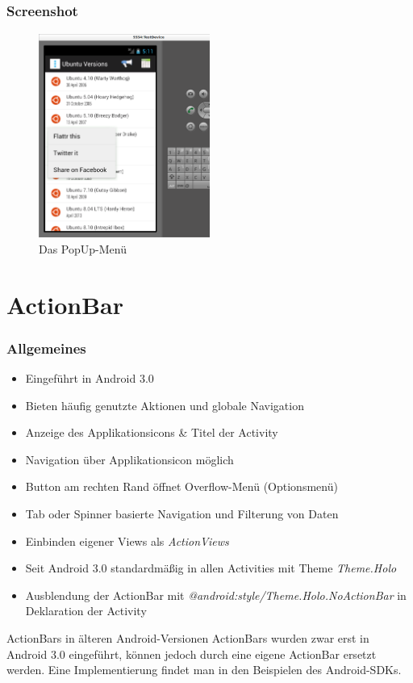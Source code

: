 \begin{frame}
   \frametitle{Screenshot}
   \begin{figure}[h!]
     \centering
     \includegraphics[width=0.5\textwidth]{pictures/ubuntu_popup.ps}
     \caption{
        Das PopUp-Menü
     }
     \label{fig:ubuntu_popup}
   \end{figure}
\end{frame}

\section{ActionBar}
\begin{frame}
   \frametitle{Allgemeines}
   \begin{itemize}
      \item Eingeführt in Android 3.0
      \item Bieten häufig genutzte Aktionen und globale Navigation
      \item Anzeige des Applikationsicons \& Titel der Activity
      \item Navigation über Applikationsicon möglich
      \item Button am rechten Rand öffnet Overflow-Menü (Optionsmenü)
      \item Tab oder Spinner basierte Navigation und Filterung von Daten
      \item Einbinden eigener Views als \emph{ActionViews}
      \item Seit Android 3.0 standardmäßig in allen Activities mit Theme \emph{Theme.Holo}
      \item Ausblendung der ActionBar mit \emph{@android:style/Theme.Holo.NoActionBar} 
         in Deklaration der Activity
   \end{itemize}

   \begin{alertblock}{ActionBars in älteren Android-Versionen}
      ActionBars wurden zwar erst in Android 3.0 eingeführt, 
      können jedoch durch eine eigene ActionBar ersetzt werden. 
      Eine Implementierung findet man in den Beispielen des Android-SDKs.
   \end{alertblock}
\end{frame}

